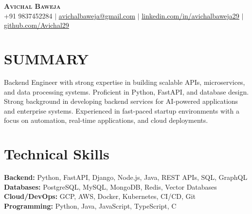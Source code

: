 \documentclass[letterpaper,10pt]{article}
\begin{document}
\begin{center}
    \textbf{\Huge \scshape Avichal Baweja} \\ \vspace{1pt}
    \small +91 9837452284 $|$ \href{mailto:avichalbaweja@gmail.com}{\underline{avichalbaweja@gmail.com}} $|$
    \href{https://www.linkedin.com/in/avichalbaweja29/}{\underline{linkedin.com/in/avichalbaweja29}} $|$
    \href{https://github.com/avichal29}{\underline{github.com/Avichal29}}
\end{center}

\section{SUMMARY}
Backend Engineer with strong expertise in building scalable APIs, microservices, and data processing systems. Proficient in Python, FastAPI, and database design. Strong background in developing backend services for AI-powered applications and enterprise systems. Experienced in fast-paced startup environments with a focus on automation, real-time applications, and cloud deployments.

\section{Technical Skills}
\begin{itemize}[leftmargin=0.2in, label={}]
    \small{\item{
    \textbf{Backend:} Python, FastAPI, Django, Node.js, Java, REST APIs, SQL, GraphQL \\
    \textbf{Databases:} PostgreSQL, MySQL, MongoDB, Redis, Vector Databases \\
    \textbf{Cloud/DevOps:} GCP, AWS, Docker, Kubernetes, CI/CD, Git \\
    \textbf{Programming:} Python, Java, JavaScript, TypeScript, C \\
    }}
\end{itemize}
\end{document}
